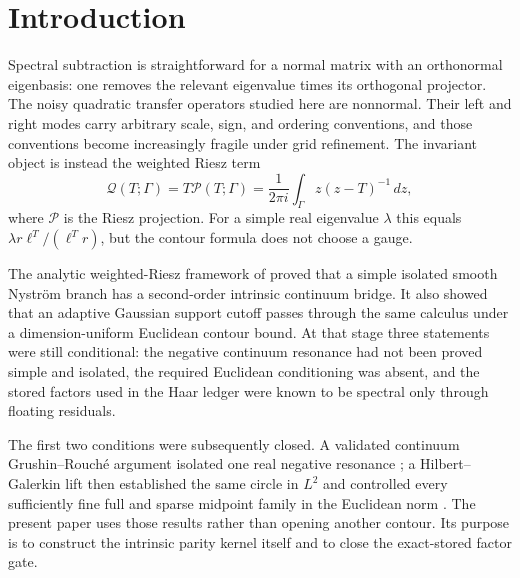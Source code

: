 \documentclass[11pt]{article}
\theoremstyle{definition}
\theoremstyle{remark}
\newcommand{\cQ}{\mathcal Q}
\newcommand{\cP}{\mathcal P}
\begin{document}
\section{Introduction}
\label{sec:introduction}

Spectral subtraction is straightforward for a normal matrix with an
orthonormal eigenbasis: one removes the relevant eigenvalue times its
orthogonal projector.  The noisy quadratic transfer operators studied here
are nonnormal.  Their left and right modes carry arbitrary scale, sign, and
ordering conventions, and those conventions become increasingly fragile
under grid refinement.  The invariant object is instead the weighted Riesz
term
\[
 \cQ(T;\Gamma)=T\cP(T;\Gamma)
 =\frac{1}{2\pi i}\int_\Gamma z(z-T)^{-1}\,dz,
\]
where $\cP$ is the Riesz projection.  For a simple real eigenvalue
$\lambda$ this equals $\lambda r\ell^T/(\ell^Tr)$, but the contour formula
does not choose a gauge.

The analytic weighted-Riesz framework of \citet{WangRiesz2026} proved that
a simple isolated smooth Nystr\"om branch has a second-order intrinsic
continuum bridge.  It also showed that an adaptive Gaussian support cutoff
passes through the same calculus under a dimension-uniform Euclidean
contour bound.  At that stage three statements were still conditional:
the negative continuum resonance had not been proved simple and isolated,
the required Euclidean conditioning was absent, and the stored factors used
in the Haar ledger were known to be spectral only through floating
residuals.

The first two conditions were subsequently closed.  A validated continuum
Grushin--Rouch\'e argument isolated one real negative resonance
\citep{WangContinuumContour2026}; a Hilbert--Galerkin lift then established
the same circle in $L^2$ and controlled every sufficiently fine full and
sparse midpoint family in the Euclidean norm
\citep{WangEuclidean2026}.  The present paper uses those results rather than
opening another contour.  Its purpose is to construct the intrinsic parity
kernel itself and to close the exact-stored factor gate.
\end{document}
